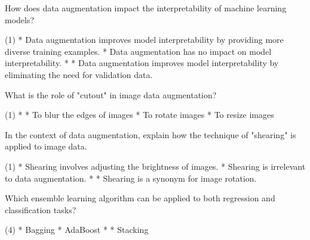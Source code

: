 \documentclass[10pt]{extarticle}
\begin{document}
\begin{exercise}
    How does data augmentation impact the interpretability of machine learning models?
    \begin{choice} (1)
        * Data augmentation improves model interpretability by providing more diverse training examples.
        * Data augmentation has no impact on model interpretability.
        * 
        * Data augmentation improves model interpretability by eliminating the need for validation data.
    \end{choice}
\end{exercise}
\begin{solution}
\end{solution}

\begin{exercise}
    What is the role of "cutout" in image data augmentation?
    \begin{choice} (1)
        * 
        * To blur the edges of images
        * To rotate images
        * To resize images
    \end{choice}
\end{exercise}
\begin{solution}
\end{solution}

\begin{exercise}
    In the context of data augmentation, explain how the technique of "shearing" is applied to image data.
    \begin{choice} (1)
        * Shearing involves adjusting the brightness of images.
        * Shearing is irrelevant to data augmentation.
        * 
        * Shearing is a synonym for image rotation.
    \end{choice}
\end{exercise}
\begin{solution}
\end{solution}

\begin{exercise}
    Which ensemble learning algorithm can be applied to both regression and classification tasks?
    \begin{choice} (4)
        * Bagging
        * AdaBoost
        * 
        * Stacking
    \end{choice}
\end{exercise}
\begin{solution}
\end{solution}
\end{document}

